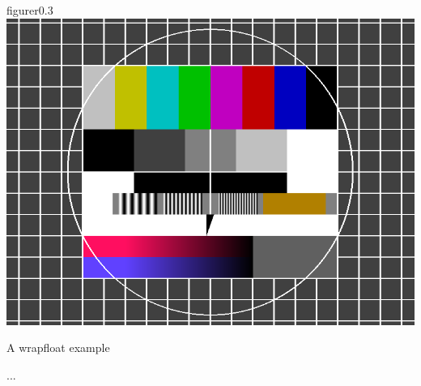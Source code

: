 \begin{filecontents*}{\democodefile}
\begin{wrapfloat}{figure}{r}{0.3\textwidth}
  \includegraphics[width=0.8\linewidth]{images/testimage.png}
  \caption{A wrapfloat example}
\end{wrapfloat}
...
\end{filecontents*}

